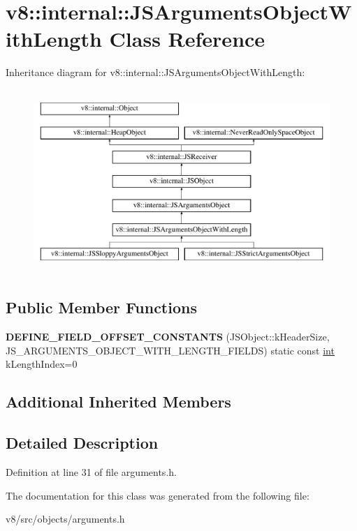 \hypertarget{classv8_1_1internal_1_1JSArgumentsObjectWithLength}{}\section{v8\+:\+:internal\+:\+:J\+S\+Arguments\+Object\+With\+Length Class Reference}
\label{classv8_1_1internal_1_1JSArgumentsObjectWithLength}
Inheritance diagram for v8\+:\+:internal\+:\+:J\+S\+Arguments\+Object\+With\+Length\+:\begin{figure}[H]
\begin{center}
\leavevmode
\includegraphics[height=7.000000cm]{classv8_1_1internal_1_1JSArgumentsObjectWithLength}
\end{center}
\end{figure}
\subsection*{Public Member Functions}
\begin{DoxyCompactItemize}
\item 
\mbox{\label{classv8_1_1internal_1_1JSArgumentsObjectWithLength_a9a75403ec5283ac339743dd3a4849289}} 
{\bfseries D\+E\+F\+I\+N\+E\+\_\+\+F\+I\+E\+L\+D\+\_\+\+O\+F\+F\+S\+E\+T\+\_\+\+C\+O\+N\+S\+T\+A\+N\+TS} (J\+S\+Object\+::k\+Header\+Size, J\+S\+\_\+\+A\+R\+G\+U\+M\+E\+N\+T\+S\+\_\+\+O\+B\+J\+E\+C\+T\+\_\+\+W\+I\+T\+H\+\_\+\+L\+E\+N\+G\+T\+H\+\_\+\+F\+I\+E\+L\+DS) static const \mbox{\hyperlink{classint}{int}} k\+Length\+Index=0
\end{DoxyCompactItemize}
\subsection*{Additional Inherited Members}


\subsection{Detailed Description}


Definition at line 31 of file arguments.\+h.



The documentation for this class was generated from the following file\+:\begin{DoxyCompactItemize}
\item 
v8/src/objects/arguments.\+h\end{DoxyCompactItemize}
